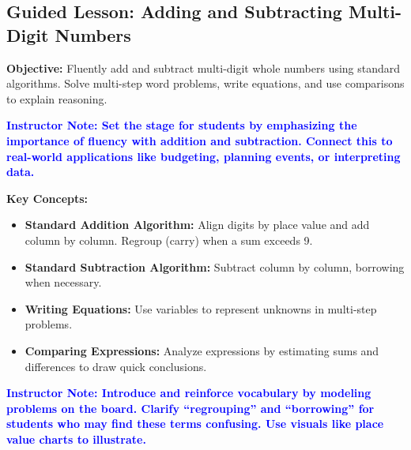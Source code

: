 \documentclass[27.11148pt]{article}
\newcommand{\note}[1]{\textcolor{blue}{\textbf{Instructor Note: #1}}}
\begin{document}
\subsection*{Guided Lesson: Adding and Subtracting Multi-Digit Numbers}
\onehalfspacing

\begin{tcolorbox}[colframe=black!40, colback=gray!5, 
coltitle=black, colbacktitle=black!20, fonttitle=\bfseries\Large, 
title=Learning Objective, halign title=center, left=5pt, right=5pt, top=5pt, bottom=15pt]
\textbf{Objective:} Fluently add and subtract multi-digit whole numbers using standard algorithms. Solve multi-step word problems, write equations, and use comparisons to explain reasoning.

\note{Set the stage for students by emphasizing the importance of fluency with addition and subtraction. Connect this to real-world applications like budgeting, planning events, or interpreting data.}
\end{tcolorbox}

\begin{tcolorbox}[colframe=black!60, colback=white, 
coltitle=black, colbacktitle=black!15, fonttitle=\bfseries\Large, 
title=Key Concepts and Vocabulary, halign title=center, left=10pt, right=10pt, top=10pt, bottom=15pt]
\textbf{Key Concepts:}
\begin{itemize}
    \item \textbf{Standard Addition Algorithm:} Align digits by place value and add column by column. Regroup (carry) when a sum exceeds 9.
    \item \textbf{Standard Subtraction Algorithm:} Subtract column by column, borrowing when necessary.
    \item \textbf{Writing Equations:} Use variables to represent unknowns in multi-step problems.
    \item \textbf{Comparing Expressions:} Analyze expressions by estimating sums and differences to draw quick conclusions.
\end{itemize}

\note{Introduce and reinforce vocabulary by modeling problems on the board. Clarify “regrouping” and “borrowing” for students who may find these terms confusing. Use visuals like place value charts to illustrate.}
\end{tcolorbox}
\end{document}

